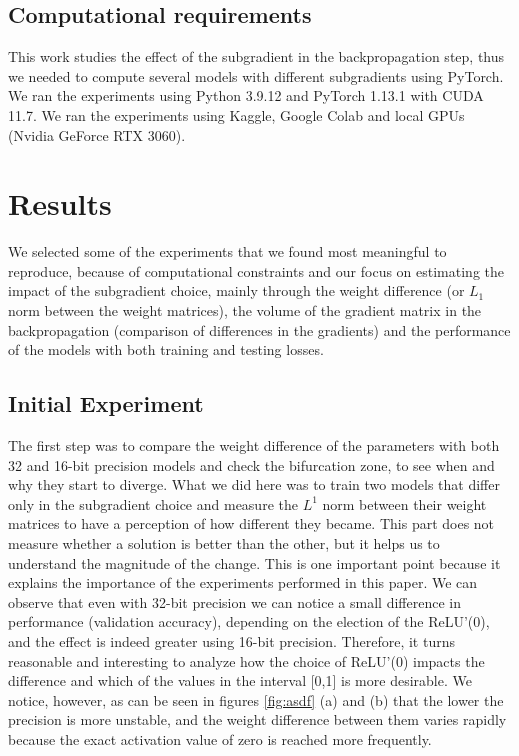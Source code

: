 \subsection{Computational requirements}
This work studies the effect of the subgradient in the backpropagation step, thus we needed to compute several models with different subgradients using PyTorch. We ran the experiments using Python 3.9.12 and PyTorch 1.13.1 with CUDA 11.7. We ran the experiments using Kaggle, Google Colab and local GPUs	(Nvidia GeForce RTX 3060).

\section{Results}
\label{sec:results}
We selected some of the experiments that we found most meaningful to reproduce, because of computational constraints and our focus on estimating the impact of the subgradient choice, mainly through the weight difference (or $L_1$ norm between the weight matrices), the volume of the gradient matrix in the backpropagation (comparison of differences in the gradients) and the performance of the models with both training and testing losses.

\subsection{Initial Experiment} 

The first step was to compare the weight difference of the parameters with both 32 and 16-bit precision models and check the bifurcation zone, to see when and why they start to diverge. What we did here was to train two models that differ only in the subgradient choice and measure the $L^1$ norm between their weight matrices to have a perception of how different they became. This part does not measure whether a solution is better than the other, but it helps us to understand the magnitude of the change. This is one important point because it explains the importance of the experiments performed in this paper. We can observe that even with 32-bit precision we can notice a small difference in performance (validation accuracy), depending on the election of the ReLU'(0), and the effect is indeed greater using 16-bit precision. Therefore, it turns reasonable and interesting to analyze how the choice of ReLU'(0) impacts the difference and which of the values in the interval [0,1] is more desirable. We notice, however, as can be seen in figures \ref{fig:asdf} (a) and (b) that the lower the precision is more unstable, and the weight difference between them varies rapidly because the exact activation value of zero is reached more frequently.

